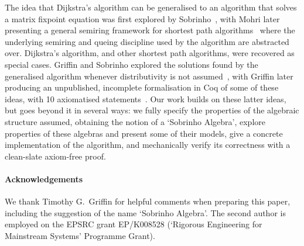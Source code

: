 The idea that Dijkstra's algorithm can be generalised to an algorithm that solves a matrix fixpoint equation was first explored by Sobrinho~\cite{sobrinho_algebra_2001}, with Mohri later presenting a general semiring framework for shortest path algorithms~\cite{mohri:semiring:2002} where the underlying semiring and queing discipline used by the algorithm are abstracted over.
Dijkstra's algorithm, and other shortest path algorithms, were recovered as special cases.
Griffin and Sobrinho explored the solutions found by the generalised algorithm whenever distributivity is not assumed~\cite{sobrinho_routing_2010}, with Griffin later producing an unpublished, incomplete formalisation in Coq of some of these ideas, with 10 axiomatised statements~\cite{griffin:equilibrium-coq}.
Our work builds on these latter ideas, but goes beyond it in several ways: we fully specify the properties of the algebraic structure assumed, obtaining the notion of a `Sobrinho Algebra', explore properties of these algebras and present some of their models, give a concrete implementation of the algorithm, and mechanically verify its correctness with a clean-slate axiom-free proof.

\paragraph{Acknowledgements} We thank Timothy G.~Griffin for helpful comments when preparing this paper, including the suggestion of the name `Sobrinho Algebra'.
The second author is employed on the EPSRC grant EP/K008528 (`Rigorous Engineering for Mainstream Systems' Programme Grant).
